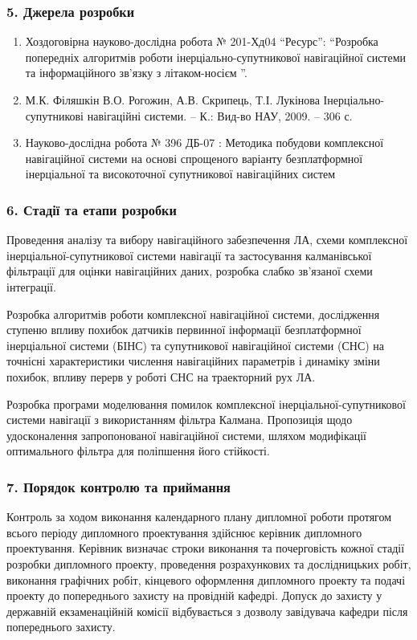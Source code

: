\subsubsection*{5. Джерела розробки}
\begin{enumerate}
 \item Хоздоговірна науково-дослідна робота № 201-Хд04 “Ресурс”: “Розробка 
попередніх алгоритмів роботи інерціально-супутникової навігаційної 
системи та інформаційного зв'язку з літаком-носієм ”.
 \item М.К. Філяшкін В.О. Рогожин, А.В. Скрипець, Т.І. Лукінова 
Інерціально-супутникові навігаційні  системи. – К.: Вид-во НАУ, 2009. – 306 с.
 \item Науково-дослідна робота  № 396 ДБ-07 : Методика побудови 
комплексної навігаційної системи на основі спрощеного варіанту 
безплатформної інерціальної та високоточної супутникової навігаційних систем
\end{enumerate}
\subsubsection*{6. Стадії та етапи розробки}
Проведення аналізу та вибору навігаційного забезпечення ЛА, схеми комплексної інерціальної-супутникової системи навігації та застосування калманівської фільтрації для оцінки навігаційних даних, розробка слабко зв’язаної схеми інтеграції.

Розробка алгоритмів роботи комплексної навігаційної системи, дослідження ступеню впливу похибок датчиків первинної інформації безплатформної інерціальної системи (БІНС) та супутникової навігаційної системи (СНС) на точнісні характеристики числення навігаційних параметрів і динаміку зміни похибок, впливу перерв у роботі СНС на траекторний рух ЛА.

Розробка програми моделювання помилок комплексної інерціальної-супутникової системи навігації з використанням фільтра Калмана. Пропозиція щодо удосконалення запропонованої навігаційної системи, шляхом модифікації оптимального фільтра для поліпшення його стійкості.

\subsubsection*{7. Порядок контролю та приймання}
Контроль за ходом виконання календарного плану дипломної роботи протягом всього періоду дипломного проектування здійснює керівник дипломного проектування. Керівник визначає строки виконання та почерговість кожної стадії розробки дипломного проекту, проведення розрахункових та дослідницьких робіт, виконання графічних робіт, кінцевого оформлення дипломного проекту та подачі проекту до попереднього захисту  на провідній кафедрі. Допуск до захисту у державній екзаменаційній комісії відбувається з дозволу завідувача кафедри після попереднього захисту.

